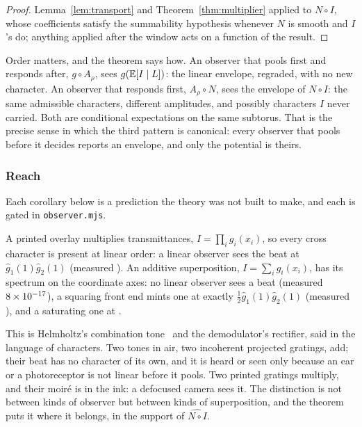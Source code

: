 \begin{proof}
Lemma~\ref{lem:transport} and Theorem~\ref{thm:multiplier} applied to
$N\circ I$, whose coefficients satisfy the summability hypothesis whenever
$N$ is smooth and $I$'s do; anything applied after the window acts on a
function of the result.
\end{proof}

Order matters, and the theorem says how. An observer that pools first and
responds after, $g\circ A_\rho$, sees $g(\mathbb{E}[I\mid L])$: the linear envelope,
regraded, with no new character. An observer that responds first,
$A_\rho\circ N$, sees the envelope of $N\circ I$: the same admissible
characters, different amplitudes, and possibly characters $I$ never carried.
Both are conditional expectations on the same subtorus. That is the precise
sense in which the third pattern is canonical: every observer that pools
before it decides reports an envelope, and only the potential is theirs.

\subsubsection{Reach}

Each corollary below is a prediction the theory was not built to make, and
each is gated in \texttt{observer.mjs}.

\begin{corollary}
\label{cor:whosees}
A printed overlay multiplies transmittances, $I=\prod_i g_i(x_i)$, so every cross
character is present at linear order: a linear observer sees the beat at
$\hat g_1(1)\hat g_2(1)$ (measured \obsPrintedBeat). An additive superposition,
$I=\sum_i g_i(x_i)$, has its spectrum on the coordinate axes: no linear observer
sees a beat (measured $8\times 10^{-17}$), a squaring front end mints one at
exactly $\tfrac12\hat g_1(1)\hat g_2(1)$ (measured \obsSquaringBeat), and a
saturating one at \obsSaturatingBeat.
\end{corollary}

This is Helmholtz's combination tone~\cite{Helmholtz1954Sensations} and the
demodulator's rectifier, said in the language of characters. Two tones in air, two incoherent projected
gratings, add; their beat has no character of its own, and it is heard or seen
only because an ear or a photoreceptor is not linear before it pools. Two
printed gratings multiply, and their moir\'e is in the ink: a defocused camera
sees it. The distinction is not between kinds of observer but between kinds
of superposition, and the theorem puts it where it belongs, in the support of
$\widehat{N\circ I}$.

